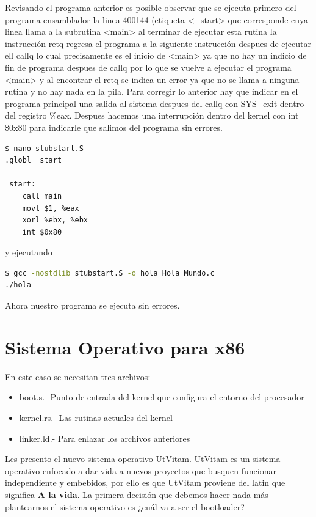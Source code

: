 \documentclass[12pt, twoside]{report}
\begin{document}
Revisando el programa anterior es posible observar que se ejecuta primero del programa ensamblador la linea 400144 (etiqueta <\_start> que corresponde cuya linea llama a la subrutina <main> al terminar de ejecutar esta rutina la instrucción retq regresa el programa a la siguiente instrucción despues de ejecutar ell callq lo cual precisamente es el inicio de <main> ya que no hay un indicio de fin de programa despues de callq por lo que se vuelve a ejecutar el programa <main> y al encontrar el retq se indica un error ya que no se llama a ninguna rutina y no hay nada en la pila. Para corregir lo anterior hay que indicar en el programa principal una salida  al sistema despues del callq con SYS\_exit dentro del registro \%eax. Despues hacemos una interrupción dentro del kernel con int \$0x80 para indicarle que salimos del programa sin errores.

\begin{lstlisting}[language={[x86masm]Assembler}]
$ nano stubstart.S
.globl _start

_start:
    call main
    movl $1, %eax
    xorl %ebx, %ebx
    int $0x80
\end{lstlisting}

y ejecutando
\begin{lstlisting}[language=bash]
$ gcc -nostdlib stubstart.S -o hola Hola_Mundo.c
./hola
\end{lstlisting}

Ahora nuestro programa se ejecuta sin errores.
\chapter{Sistema Operativo para x86}

En este caso se necesitan tres archivos:
\begin{itemize}
\item boot.s.- Punto de entrada del kernel que configura el entorno del procesador
\item kernel.rs.- Las rutinas actuales del kernel
\item linker.ld.- Para enlazar los archivos anteriores 
\end{itemize}


Les presento el nuevo sistema operativo UtVitam. UtVitam es un sistema operativo enfocado a dar vida a nuevos proyectos que busquen funcionar independiente y embebidos, por ello es que UtVitam proviene del latin que significa \textbf{A la vida}. La primera decisión que debemos hacer nada más plantearnos el sistema operativo es ¿cuál va a ser el bootloader?
\end{document}
